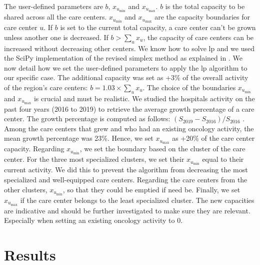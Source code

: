 The user-defined parameters are $b$, $x_{u_\text{min}}$ and $x_{u_\text{max}}$. $b$ is the total capacity to be shared across all the care centers. $x_{u_\text{min}}$ and $x_{u_\text{max}}$ are the capacity boundaries for care center $u$. If $b$ is set to the current total capacity, a care center can’t be grown unless another one is decreased. If $b > \sum_{u} x_u$, the capacity of care centers can be increased without decreasing other centers. We know how to solve \ac{lp} and we used the SciPy \cite{virtanen_scipy_2020} implementation of the revised simplex method as explained in \cite{bertsimas_introduction_1998}.
We now detail how we set the user-defined parameters to apply the \ac{lp} algorithm to our specific case. The additional capacity was set as +3\% of the overall activity of the region's care centers: $b = 1.03 \times \sum_{u} x_u$. The choice of the boundaries $x_{u_\text{min}}$  and $x_{u_\text{max}}$ is crucial and must be realistic. We studied the hospitals activity on the past four years (2016 to 2019) to retrieve the average growth percentage of a care center. The growth percentage is computed as follows: $(S_\text{2019} - S_\text{2016}) / S_\text{2016}$ . Among the care centers that grew and who had an existing oncology activity, the mean growth percentage was 23\%. Hence, we set $x_{u_\text{max}}$ as +20\% of the care center capacity. Regarding $x_{u_\text{min}}$, we set the boundary based on the cluster of the care center. For the three most specialized clusters, we set their $x_{u_\text{min}}$ equal to their current activity. We did this to prevent the algorithm from decreasing the most specialized and well-equipped care centers. Regarding the care centers from the other clusters, $x_{u_\text{min}}$, so that they could be emptied if need be. Finally, we set $x_{u_\text{max}}$ if the care center belongs to the least specialized cluster. The new capacities are indicative and should be further investigated to make sure they are relevant. Especially when setting an existing oncology activity to 0.

\section{Results}

